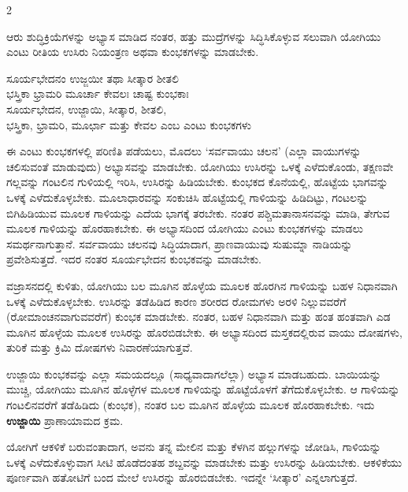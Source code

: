 \begin{multicols}{2}
\begin{kan}


ಆರು ಶುದ್ಧಿಕ್ರಿಯೆಗಳನ್ನು ಅಭ್ಯಾಸ ಮಾಡಿದ ನಂತರ, ಹತ್ತು ಮುದ್ರೆಗಳನ್ನು ಸಿದ್ಧಿಸಿಕೊಳ್ಳುವ ಸಲುವಾಗಿ ಯೋಗಿಯು ಎಂಟು ರೀತಿಯ ಉಸಿರು ನಿಯಂತ್ರಣ ಅಥವಾ ಕುಂಭಕಗಳನ್ನು ಮಾಡಬೇಕು. 

{\leftskip=15pt
\rightskip=15pt
ಸೂರ್ಯಭೇದನಂ ಉಜ್ಜಯೀ ತಥಾ ಸೀತ್ಕಾರ ಶೀತಲಿ\\
ಭಸ್ತ್ರಿಕಾ ಭ್ರಾಮರಿ ಮೂರ್ಚಾ ಕೇವಲಃ ಚಾಷ್ಟ ಕುಂಭಕಾಃ\\
ಸೂರ್ಯಭೇದನ, ಉಜ್ಜಾಯಿ, ಸೀತ್ಕಾರ, ಶೀತಲಿ,\\ 
ಭಸ್ತ್ರಿಕಾ, ಭ್ರಾಮರಿ, ಮೂರ್ಛಾ ಮತ್ತು ಕೇವಲ ಎಂಬ ಎಂಟು ಕುಂಭಕಗಳು
\par}
\vskip 7pt

ಈ ಎಂಟು ಕುಂಭಕಗಳಲ್ಲಿ ಪರಿಣಿತಿ ಪಡೆಯಲು, ಮೊದಲು ‘ಸರ್ವವಾಯು ಚಲನ’ (ಎಲ್ಲಾ ವಾಯುಗಳನ್ನು ಚಲಿಸುವಂತೆ ಮಾಡುವುದು) ಅಭ್ಯಾಸವನ್ನು ಮಾಡಬೇಕು. ಯೋಗಿಯು ಉಸಿರನ್ನು ಒಳಕ್ಕೆ ಎಳೆದುಕೊಂಡು, ತಕ್ಷಣವೇ ಗಲ್ಲವನ್ನು ಗಂಟಲಿನ ಗುಳಿಯಲ್ಲಿ ಇರಿಸಿ, ಉಸಿರನ್ನು ಹಿಡಿಯಬೇಕು. ಕುಂಭಕದ ಕೊನೆಯಲ್ಲಿ, ಹೊಟ್ಟೆಯ ಭಾಗವನ್ನು ಒಳಕ್ಕೆ ಎಳೆದುಕೊಳ್ಳಬೇಕು. ಮೂಲಾಧಾರವನ್ನು ಸಂಕುಚಿಸಿ ಹೊಟ್ಟೆಯಲ್ಲಿ ಗಾಳಿಯನ್ನು ಹಿಡಿದಿಟ್ಟು, ಗಂಟಲನ್ನು ಬಿಗಿಹಿಡಿಯುವ ಮೂಲಕ ಗಾಳಿಯನ್ನು ಎದೆಯ ಭಾಗಕ್ಕೆ ತರಬೇಕು. ನಂತರ ಪಶ್ಚಿಮತಾನಾಸನವನ್ನು ಮಾಡಿ, ತೇಗುವ ಮೂಲಕ ಗಾಳಿಯನ್ನು ಹೊರಹಾಕಬೇಕು. ಈ ಅಭ್ಯಾಸದಿಂದ ಯೋಗಿಯು ಎಂಟು ಕುಂಭಕಗಳನ್ನು ಮಾಡಲು ಸಮರ್ಥನಾಗುತ್ತಾನೆ. ಸರ್ವವಾಯು ಚಲನವು ಸಿದ್ಧಿಯಾದಾಗ, ಪ್ರಾಣವಾಯುವು ಸುಷುಮ್ನಾ ನಾಡಿಯನ್ನು ಪ್ರವೇಶಿಸುತ್ತದೆ. ಇದರ ನಂತರ ಸೂರ್ಯಭೇದನ ಕುಂಭಕವನ್ನು ಮಾಡಬೇಕು.
\vskip 7pt


ವಜ್ರಾಸನದಲ್ಲಿ ಕುಳಿತು, ಯೋಗಿಯು ಬಲ ಮೂಗಿನ ಹೊಳ್ಳೆಯ ಮೂಲಕ ಹೊರಗಿನ ಗಾಳಿಯನ್ನು ಬಹಳ ನಿಧಾನವಾಗಿ ಒಳಕ್ಕೆ ಎಳೆದುಕೊಳ್ಳಬೇಕು. ಉಸಿರನ್ನು ತಡೆಹಿಡಿದ ಕಾರಣ ಶರೀರದ ರೋಮಗಳು ಅರಳಿ ನಿಲ್ಲುವವರೆಗೆ (ರೋಮಾಂಚನವಾಗುವವರೆಗೆ) ಕುಂಭಕ ಮಾಡಬೇಕು. ನಂತರ, ಬಹಳ ನಿಧಾನವಾಗಿ ಮತ್ತು ಹಂತ ಹಂತವಾಗಿ ಎಡ ಮೂಗಿನ ಹೊಳ್ಳೆಯ ಮೂಲಕ ಉಸಿರನ್ನು ಹೊರಬಿಡಬೇಕು. ಈ ಅಭ್ಯಾಸದಿಂದ ಮಸ್ತಕದಲ್ಲಿರುವ ವಾಯು ದೋಷಗಳು, ತುರಿಕೆ ಮತ್ತು ಕ್ರಿಮಿ ದೋಷಗಳು ನಿವಾರಣೆಯಾಗುತ್ತವೆ.
\columnbreak


 ಉಜ್ಜಾಯಿ ಕುಂಭಕವನ್ನು ಎಲ್ಲಾ ಸಮಯದಲ್ಲೂ (ಸಾಧ್ಯವಾದಾಗಲೆಲ್ಲಾ) ಅಭ್ಯಾಸ ಮಾಡಬಹುದು. ಬಾಯಿಯನ್ನು ಮುಚ್ಚಿ, ಯೋಗಿಯು ಮೂಗಿನ ಹೊಳ್ಳೆಗಳ ಮೂಲಕ ಗಾಳಿಯನ್ನು ಹೊಟ್ಟೆಯೊಳಗೆ ತೆಗೆದುಕೊಳ್ಳಬೇಕು. ಆ ಗಾಳಿಯನ್ನು ಗಂಟಲಿನವರೆಗೆ ತಡೆಹಿಡಿದು (ಕುಂಭಕ), ನಂತರ ಬಲ ಮೂಗಿನ ಹೊಳ್ಳೆಯ ಮೂಲಕ ಹೊರಹಾಕಬೇಕು. ಇದು \textbf{ಉಜ್ಜಾಯಿ} ಪ್ರಾಣಾಯಾಮದ ಕ್ರಮ.
\vskip 7pt


 ಯೋಗಿಗೆ ಆಕಳಿಕೆ ಬರುವಂತಾದಾಗ, ಅವನು ತನ್ನ ಮೇಲಿನ ಮತ್ತು ಕೆಳಗಿನ ಹಲ್ಲುಗಳನ್ನು ಜೋಡಿಸಿ, ಗಾಳಿಯನ್ನು ಒಳಕ್ಕೆ ಎಳೆದುಕೊಳ್ಳುವಾಗ ಸೀಟಿ ಹೊಡೆದಂತಹ ಶಬ್ದವನ್ನು ಮಾಡಬೇಕು ಮತ್ತು ಉಸಿರನ್ನು ಹಿಡಿಯಬೇಕು. ಆಕಳಿಕೆಯು ಪೂರ್ಣವಾಗಿ ಹತೋಟಿಗೆ ಬಂದ ಮೇಲೆ ಉಸಿರನ್ನು ಹೊರಬಿಡಬೇಕು. ಇದನ್ನೇ ‘ಸೀತ್ಕಾರ’ ಎನ್ನಲಾಗುತ್ತದೆ.
\vskip 7pt


\end{kan}
\end{multicols}
